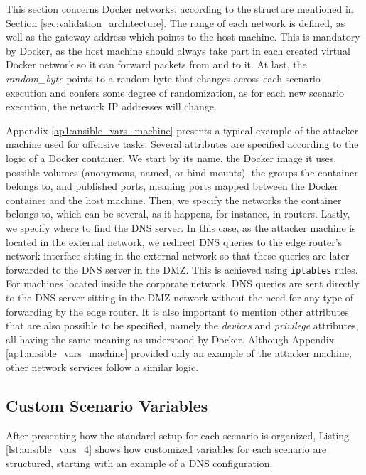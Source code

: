 This section concerns Docker networks, according to the structure mentioned in Section \ref{sec:validation_architecture}. The range of each network is defined, as well as the gateway address which points to the host machine. This is mandatory by Docker, as the host machine should always take part in each created virtual Docker network so it can forward packets from and to it. At last, the \textit{random\_byte} points to a random byte that changes across each scenario execution and confers some degree of randomization, as for each new scenario execution, the network IP addresses will change. 

Appendix \ref{ap1:ansible_vars_machine} presents a typical example of the attacker machine used for offensive tasks. Several attributes are specified according to the logic of a Docker container. We start by its name, the Docker image it uses, possible volumes (anonymous, named, or bind mounts), the groups the container belongs to, and published ports, meaning ports mapped between the Docker container and the host machine. Then, we specify the networks the container belongs to, which can be several, as it happens, for instance, in routers. Lastly, we specify where to find the DNS server. In this case, as the attacker machine is located in the external network, we redirect DNS queries to the edge router's network interface sitting in the external network so that these queries are later forwarded to the DNS server in the DMZ. This is achieved using \texttt{iptables} rules. For machines located inside the corporate network, DNS queries are sent directly to the DNS server sitting in the DMZ network without the need for any type of forwarding by the edge router. It is also important to mention other attributes that are also possible to be specified, namely the \textit{devices} and \textit{privilege} attributes, all having the same meaning as understood by Docker. Although Appendix \ref{ap1:ansible_vars_machine} provided only an example of the attacker machine, other network services follow a similar logic.

\subsection{Custom Scenario Variables} \label{sec:custom_scenario_variables}

After presenting how the standard setup for each scenario is organized, Listing \ref{lst:ansible_vars_4} shows how customized variables for each scenario are structured, starting with an example of a DNS configuration.

